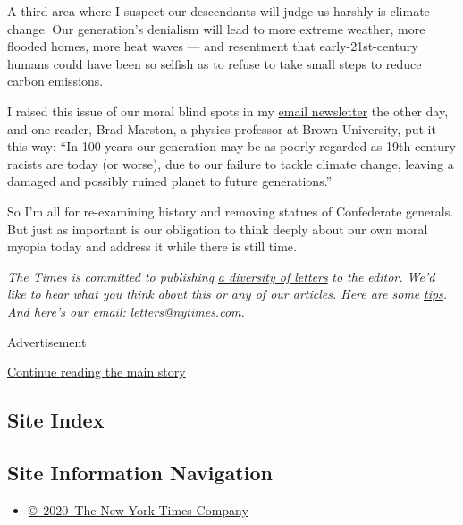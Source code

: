 A third area where I suspect our descendants will judge us harshly is
climate change. Our generation's denialism will lead to more extreme
weather, more flooded homes, more heat waves --- and resentment that
early-21st-century humans could have been so selfish as to refuse to
take small steps to reduce carbon emissions.

I raised this issue of our moral blind spots in my
\href{http://nytimes.com/kristofemail}{email newsletter} the other day,
and one reader, Brad Marston, a physics professor at Brown University,
put it this way: ``In 100 years our generation may be as poorly regarded
as 19th-century racists are today (or worse), due to our failure to
tackle climate change, leaving a damaged and possibly ruined planet to
future generations.''

So I'm all for re-examining history and removing statues of Confederate
generals. But just as important is our obligation to think deeply about
our own moral myopia today and address it while there is still time.

\emph{The Times is committed to publishing}
\href{https://www.nytimes.com/2019/01/31/opinion/letters/letters-to-editor-new-york-times-women.html}{\emph{a
diversity of letters}} \emph{to the editor. We'd like to hear what you
think about this or any of our articles. Here are some}
\href{https://help.nytimes.com/hc/en-us/articles/115014925288-How-to-submit-a-letter-to-the-editor}{\emph{tips}}\emph{.
And here's our email:}
\href{mailto:letters@nytimes.com}{\emph{letters@nytimes.com}}\emph{.}

Advertisement

\protect\hyperlink{after-bottom}{Continue reading the main story}

\hypertarget{site-index}{%
\subsection{Site Index}\label{site-index}}

\hypertarget{site-information-navigation}{%
\subsection{Site Information
Navigation}\label{site-information-navigation}}

\begin{itemize}
\tightlist
\item
  \href{https://help.nytimes.com/hc/en-us/articles/115014792127-Copyright-notice}{©~2020~The
  New York Times Company}
\end{itemize}

